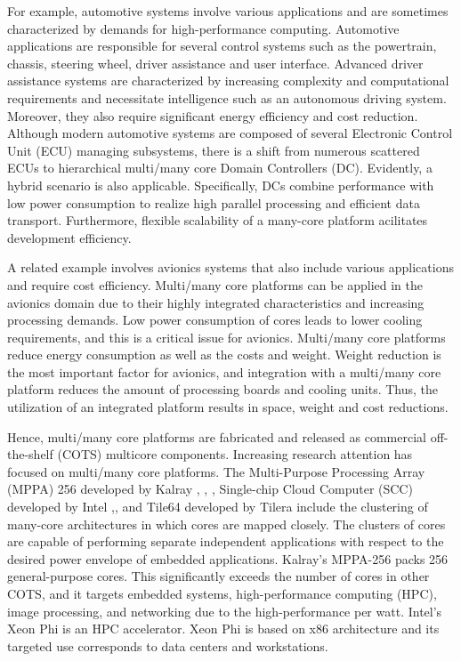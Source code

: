 \documentclass{sig-alternate-05-2015}
\begin{document}
For example, automotive systems involve various applications and are sometimes characterized by demands for high-performance computing.
Automotive applications are responsible for several control systems such as the powertrain, chassis, steering wheel, driver assistance and user interface.
Advanced driver assistance systems are
characterized by increasing complexity and computational requirements and necessitate intelligence such as an autonomous driving system.
Moreover, they also require significant energy efficiency and cost reduction.
Although modern automotive systems are composed of several Electronic Control Unit (ECU) managing subsystems,
there is a shift from numerous scattered ECUs to hierarchical multi/many core Domain Controllers (DC).
Evidently, a hybrid scenario is also applicable. 
Specifically, DCs combine performance with low power consumption to realize high parallel processing and efficient data transport.
Furthermore, flexible scalability of a many-core platform acilitates development efficiency.

A related example involves avionics systems that also include various applications and require cost efficiency.
Multi/many core platforms can be applied in the avionics domain due to their highly integrated characteristics and increasing processing demands.
Low power consumption of cores leads to lower cooling requirements, and this is a critical issue for avionics.
Multi/many core platforms reduce energy consumption as well as the costs and weight.
Weight reduction is the most important factor for avionics, and integration with a multi/many core platform reduces the amount of processing boards and cooling units.
Thus, the utilization of an integrated platform results in space, weight and cost reductions.

Hence, multi/many core platforms are fabricated and released as commercial off-the-shelf (COTS) multicore components.
Increasing research attention has focused
on multi/many core platforms.
The Multi-Purpose Processing Array (MPPA) 256 developed by Kalray \cite{de2013distributed}, \cite{de2013clustered}, \cite{de2014time}, Single-chip Cloud Computer (SCC) developed by Intel \cite{intel2015scc},\cite{baron2010single}, and Tile64 developed by Tilera \cite{tilera2015tile64} include the clustering of many-core architectures in which cores are mapped closely.
The clusters of cores are capable of performing separate independent applications with respect to the desired power envelope of embedded applications.
Kalray's MPPA-256 packs 256 general-purpose cores.
This significantly exceeds the number of cores in other COTS, and it targets embedded systems, high-performance computing (HPC), image processing, and networking due to the high-performance per watt.
Intel's Xeon Phi \cite{chrysos2014intel} \cite{chrysos2012intel} is an HPC accelerator.
Xeon Phi is based on x86 architecture and its targeted use
corresponds to data centers and workstations.
\end{document}

